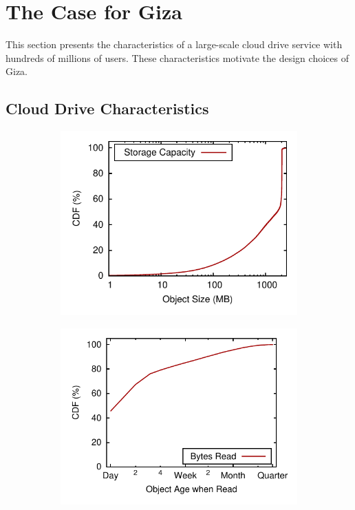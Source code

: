\section{The Case for Giza}
\label{sec:motivation}

This section presents the characteristics of a large-scale cloud drive service with hundreds of millions of users. These characteristics motivate the design choices of Giza.

\subsection{Cloud Drive Characteristics}

\begin{figure}[tp]
\hspace{-3em}
\begin{subfigure}{.3\textwidth}
  \centering
  \includegraphics[width=\linewidth]{data/object_size-storage_capacity}
  \caption{}
  \label{fig:object_size-storage_capacity}
\end{subfigure}%
\begin{subfigure}{.3\textwidth}
  \centering
  \includegraphics[width=\linewidth]{data/write_read_gap-bytes_read}

\end{subfigure}
\end{figure}
